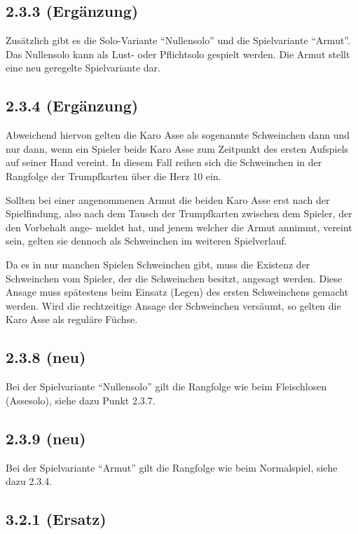 \subsection*{2.3.3 (Ergänzung)} 

Zusätzlich gibt es die Solo-Variante ``Nullensolo'' und die 
Spielvariante ``Armut''. Das Nullensolo kann als Lust- oder Pflichtsolo 
gespielt werden. Die Armut stellt eine neu geregelte Spielvariante dar. 

\subsection*{2.3.4 (Ergänzung)} 

Abweichend hiervon gelten die Karo Asse als sogenannte Schweinchen dann 
und nur dann, wenn ein Spieler beide Karo Asse zum Zeitpunkt des ersten 
Aufspiels auf seiner Hand vereint. In diesem Fall reihen sich die 
Schweinchen in der Rangfolge der Trumpfkarten über die Herz 10 ein. 

Sollten bei einer angenommenen Armut die beiden Karo Asse erst nach der 
Spielfindung, also nach dem Tausch der Trumpfkarten zwischen dem 
Spieler, der den Vorbehalt ange- meldet hat, und jenem welcher die Armut 
annimmt, vereint sein, gelten sie dennoch als Schweinchen im weiteren 
Spielverlauf. 

Da es in nur manchen Spielen Schweinchen gibt, muss die Existenz der 
Schweinchen vom Spieler, der die Schweinchen besitzt, angesagt werden. 
Diese Ansage muss spätestens beim Einsatz (Legen) des ersten 
Schweinchens gemacht werden. Wird die rechtzeitige Ansage der 
Schweinchen versäumt, so gelten die Karo Asse als reguläre Füchse. 

\subsection*{2.3.8 (neu)} 

Bei der Spielvariante ``Nullensolo'' gilt die Rangfolge wie beim 
Fleischlosen (Assesolo), siehe dazu Punkt 2.3.7. 

\subsection*{2.3.9 (neu)} 

Bei der Spielvariante ``Armut'' gilt die Rangfolge wie beim Normalspiel, 
siehe dazu 2.3.4. 

\subsection*{3.2.1 (Ersatz)} 

